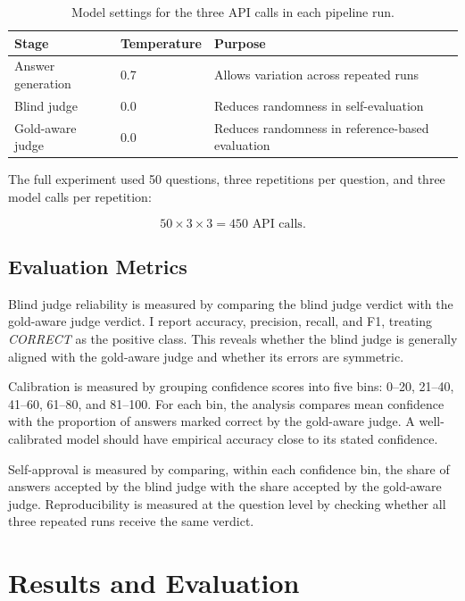 \documentclass[11pt,a4paper]{article}
\begin{document}
\begin{table}[H]
    \centering
    \begin{tabular}{lll}
        \toprule
        Stage & Temperature & Purpose \\
        \midrule
        Answer generation & 0.7 & Allows variation across repeated runs \\
        Blind judge & 0.0 & Reduces randomness in self-evaluation \\
        Gold-aware judge & 0.0 & Reduces randomness in reference-based evaluation \\
        \bottomrule
    \end{tabular}
    \caption{Model settings for the three API calls in each pipeline run.}
    \label{tab:settings}
\end{table}

The full experiment used 50 questions, three repetitions per question, and three model calls per repetition:

\[
50 \times 3 \times 3 = 450 \text{ API calls}.
\]

\subsection{Evaluation Metrics}

Blind judge reliability is measured by comparing the blind judge verdict with the gold-aware judge verdict. I report accuracy, precision, recall, and F1, treating \emph{CORRECT} as the positive class. This reveals whether the blind judge is generally aligned with the gold-aware judge and whether its errors are symmetric.

Calibration is measured by grouping confidence scores into five bins: 0--20, 21--40, 41--60, 61--80, and 81--100. For each bin, the analysis compares mean confidence with the proportion of answers marked correct by the gold-aware judge. A well-calibrated model should have empirical accuracy close to its stated confidence.

Self-approval is measured by comparing, within each confidence bin, the share of answers accepted by the blind judge with the share accepted by the gold-aware judge. Reproducibility is measured at the question level by checking whether all three repeated runs receive the same verdict.

\section{Results and Evaluation}
\end{document}
